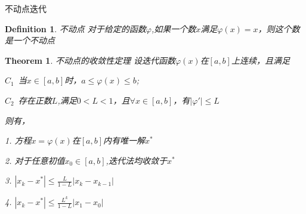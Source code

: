 \documentclass{beamer}
\newtheorem{Def}{Definition}
\newtheorem{Theo}{Theorem}
\begin{document}
\begin{frame}{不动点迭代}
\begin{Def}{不动点}
    对于给定的函数$\varphi$,如果一个数$x$满足$\varphi(x)=x$，则这个数是一个不动点
\end{Def}



\begin{Theo}{不动点的收敛性定理}
    \label{theo:apxB}
    设迭代函数$\varphi(x)$在$[a,b]$上连续，且满足
    
    $C_1$\ 当$x\in [a,b]$时，$a\leq\varphi(x)\leq b$;
    
    $C_2$\ 存在正数$L$,满足$0<L<1$，且$\forall x\in [a,b]$，有$|\varphi '|\leq L$
    
    则有，
    
    1. 方程$x=\varphi(x)$在$[a,b]$内有唯一解$x^*$
    
    2. 对于任意初值$x_0\in [a,b]$,迭代法均收敛于$x^*$
    
    3. $|x_k-x^*|\leq \frac{L}{1-L}| x_k-x_{k-1} |$
    
    4. $|x_k-x^*|\leq \frac{L^k}{1-L}| x_1-x_0 |$
\end{Theo}
\end{frame}
\end{document}
